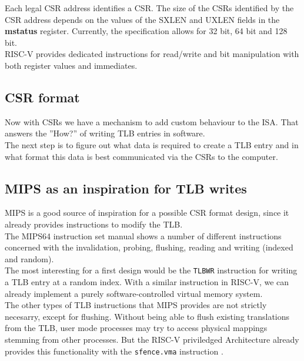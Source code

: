 Each legal CSR address identifies a CSR. The size of the CSRs identified by the CSR address depends
on the values of the SXLEN and UXLEN fields in the \textbf{mstatus} register. Currently, the
specification \cite{RISCVInstructionSet} allows for 32 bit, 64 bit and 128 bit.\\ 
RISC-V provides dedicated instructions for read/write and bit manipulation with both register values
and immediates.

\subsection{CSR format}
Now with CSRs we have a mechanism to add custom behaviour to the ISA. That answers the ''How?''
of writing TLB entries in software.\\
The next step is to figure out what data is required to create a TLB entry and in what format
this data is best communicated via the CSRs to the computer.\\

\subsection{MIPS as an inspiration for TLB writes}
MIPS is a good source of inspiration for a possible CSR format design, since it already provides
instructions to modify the TLB.\\
The MIPS64 instruction set manual \cite{MIPSArchitectureProgrammers2016}
shows a number of different instructions concerned with the invalidation, probing, flushing, reading
and writing (indexed and random).\\
The most interesting for a first design would be the \texttt{TLBWR} instruction for writing a TLB
entry at a random index. With a similar instruction in RISC-V, we can already implement a purely
software-controlled virtual memory system.\\
The other types of TLB instructions that MIPS provides are not strictly necesarry,
except for flushing. Without being able to flush existing translations from the TLB,
user mode processes may try to access physical mappings stemming from other processes.
But the RISC-V priviledged Architecture already provides this functionality
with the \texttt{sfence.vma} instruction \cite{riscvreader}.

